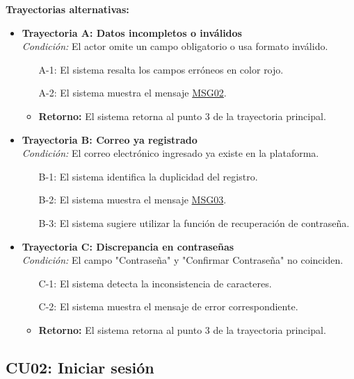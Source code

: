 \begin{appendices}
\textbf{Trayectorias alternativas:}
\begin{itemize}[leftmargin=*]
    \item \textbf{Trayectoria A: Datos incompletos o inválidos} \\
    \textit{Condición:} El actor omite un campo obligatorio o usa formato inválido.
    \begin{itemize}[nosep]
        \item[A-1:] El sistema resalta los campos erróneos en color rojo.
        \item[A-2:] El sistema muestra el mensaje \hyperlink{msg:MSG02}{MSG02}.
        \item \textbf{Retorno:} El sistema retorna al punto 3 de la trayectoria principal.
    \end{itemize}
    \item \textbf{Trayectoria B: Correo ya registrado} \\
    \textit{Condición:} El correo electrónico ingresado ya existe en la plataforma.
    \begin{itemize}[nosep]
        \item[B-1:] El sistema identifica la duplicidad del registro.
        \item[B-2:] El sistema muestra el mensaje \hyperlink{msg:MSG03}{MSG03}.
        \item[B-3:] El sistema sugiere utilizar la función de recuperación de contraseña.
    \end{itemize}
    \item \textbf{Trayectoria C: Discrepancia en contraseñas} \\
    \textit{Condición:} El campo "Contraseña" y "Confirmar Contraseña" no coinciden.
    \begin{itemize}[nosep]
        \item[C-1:] El sistema detecta la inconsistencia de caracteres.
        \item[C-2:] El sistema muestra el mensaje de error correspondiente.
        \item \textbf{Retorno:} El sistema retorna al punto 3 de la trayectoria principal.
    \end{itemize}
\end{itemize}

\newpage

\subsection{CU02: Iniciar sesión}


\end{appendices}
